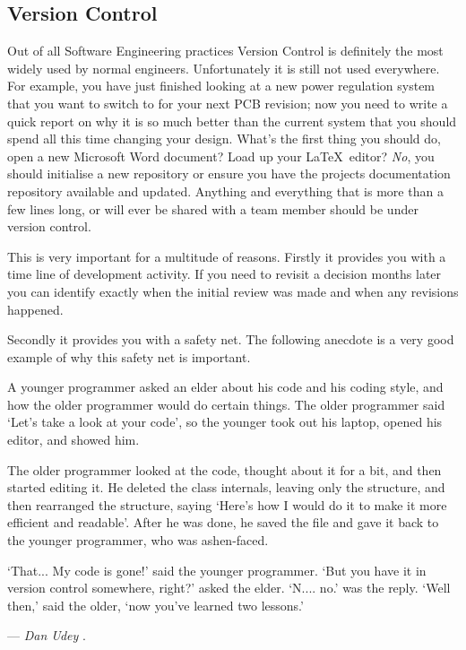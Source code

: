 \subsection{Version Control}

  Out of all Software Engineering practices Version Control is definitely the
  most widely used by normal engineers.  Unfortunately it is still not used
  everywhere.  For example, you have just finished looking at a new power
  regulation system that you want to switch to for your next PCB revision; now
  you need to write a quick report on why it is so much better than the
  current system that you should spend all this time changing your design.
  What's the first thing you should do, open a new Microsoft Word document?
  Load up your \LaTeX\ editor?  \emph{No}, you should initialise a new
  repository or ensure you have the projects documentation repository
  available and updated.  Anything and everything that is more than a few
  lines long, or will ever be shared with a team member should be under
  version control.

  This is very important for a multitude of reasons.  Firstly it provides you
  with a time line of development activity.  If you need to revisit a decision
  months later you can identify exactly when the initial review was made and
  when any revisions happened.

  Secondly it provides you with a safety net.  The following anecdote is a
  very good example of why this safety net is important.

  \begin{bigquote}

    {A younger programmer asked an elder about his code and his coding style,
    and how the older programmer would do certain things. The older programmer
    said `Let's take a look at your code', so the younger took out his laptop,
    opened his editor, and showed him.}

    \vspace{5pt}

    {The older programmer looked at the code, thought about it for a bit, and
    then started editing it. He deleted the class internals, leaving only the
    structure, and then rearranged the structure, saying `Here's how I would
    do it to make it more efficient and readable'. After he was done, he saved
    the file and gave it back to the younger programmer, who was ashen-faced.}

    \vspace{5pt}

    {`That... My code is gone!' said the younger programmer. `But you have it
    in version control somewhere, right?' asked the elder. `N.... no.' was the
    reply. `Well then,' said the older, `now you've learned two lessons.'}

    \vspace{5pt}

    --- \emph{Dan Udey} \cite{Udey_2008}.

  \end{bigquote}

